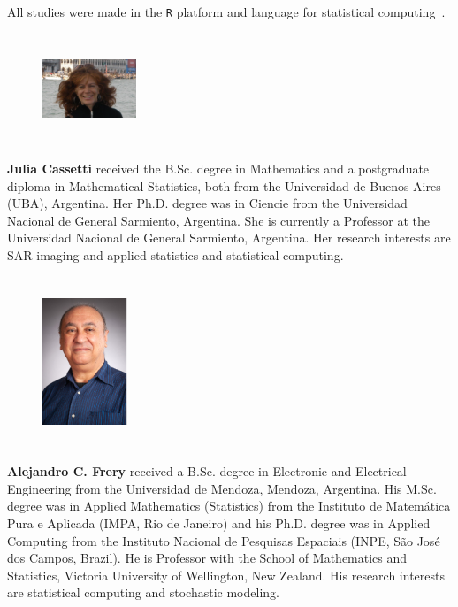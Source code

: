 \documentclass[twocolumn]{svjour3}
\begin{document}
		All studies were made in the \texttt R platform and language for statistical computing~\cite{RLanguage}.
		
		
		
		
		\begin{figure} 
			\includegraphics[width=1.1in,height=1.3in,clip]{Cassetti}
		\end{figure}\par
		\textbf{Julia Cassetti} received the B.Sc. degree in Mathematics and a postgraduate diploma in Mathematical Statistics, both from the Universidad de Buenos Aires (UBA), Argentina. Her Ph.D. degree was in Ciencie from the Universidad Nacional de General Sarmiento, Argentina. She is currently a Professor at the Universidad Nacional de General Sarmiento, Argentina. Her research interests are SAR imaging and applied statistics and statistical computing.\par


\begin{figure} 
	\includegraphics[width=1in,height=2in,clip,keepaspectratio]{Frery}
\end{figure}\par
\textbf{Alejandro C. Frery} received a B.Sc. degree in Electronic and Electrical Engineering from the Universidad de Mendoza, Mendoza, Argentina.
His M.Sc. degree was in Applied Mathematics (Statistics) from the Instituto de Matem\'atica Pura e Aplicada (IMPA, Rio de Janeiro) and his Ph.D. degree was in Applied Computing from the Instituto Nacional de Pesquisas Espaciais (INPE, S\~ao Jos\'e dos Campos, Brazil).
He is Professor with the School of Mathematics and Statistics, Victoria University of Wellington, New Zealand.
His research interests are statistical computing and stochastic modeling.
\par
		
	
\end{document}
